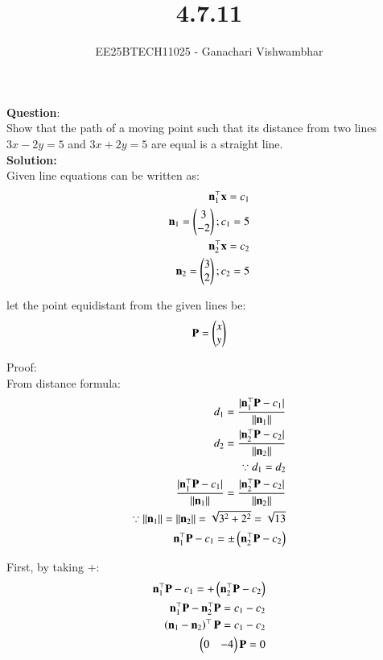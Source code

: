 \documentclass[journal]{IEEEtran}
\begin{document}
\title{4.7.11}
\author{EE25BTECH11025 - Ganachari Vishwambhar}
\maketitle

\textbf{Question}:\\
Show that the path of a moving point such that its distance from two lines  $3x-2y=5$ and $3x+2y=5$ are equal is a straight line.\\
\textbf{Solution: }\\

Given line equations can be written as:
\begin{align}
    \mathbf{n}_1^\top\mathbf{x}=c_1\\
    \mathbf{n}_1=\begin{pmatrix}3\\-2\end{pmatrix};c_1=5\\
    \mathbf{n}_2^\top\mathbf{x}=c_2\\
    \mathbf{n}_2=\begin{pmatrix}3\\2\end{pmatrix};c_2=5
\end{align}


let the point equidistant from the given lines be:
\begin{align}
    \mathbf{P}=\begin{pmatrix}x\\y\end{pmatrix}
\end{align}

Proof:\\

From distance formula:
\begin{align}
    d_1=\frac{|\mathbf{n}_1^\top\mathbf{P}-c_1|}{||\mathbf{n}_1||}\\
    d_2=\frac{|\mathbf{n}_2^\top\mathbf{P}-c_2|}{||\mathbf{n}_2||}\\
    \because d_1=d_2\\
    \frac{|\mathbf{n}_1^\top\mathbf{P}-c_1|}{||\mathbf{n}_1||}=\frac{|\mathbf{n}_2^\top\mathbf{P}-c_2|}{||\mathbf{n}_2||}\\
    \because ||\mathbf{n}_1||=||\mathbf{n}_2||=\sqrt{3^2+2^2}=\sqrt{13}\\
    \mathbf{n}_1^\top\mathbf{P}-c_1=\pm\left(\mathbf{n}_2^\top\mathbf{P}-c_2\right)
\end{align}

First, by taking $+$:
\begin{align}
    \mathbf{n}_1^\top\mathbf{P}-c_1=+\left(\mathbf{n}_2^\top\mathbf{P}-c_2\right)\\
    \mathbf{n}_1^\top\mathbf{P}-\mathbf{n}_2^\top\mathbf{P}=c_1-c_2\\
    \left(\mathbf{n}_1-\mathbf{n}_2\right)^\top\mathbf{P}=c_1-c_2\\
    \begin{pmatrix}0&-4\end{pmatrix}\mathbf{P}=0
\end{align}
\end{document}
